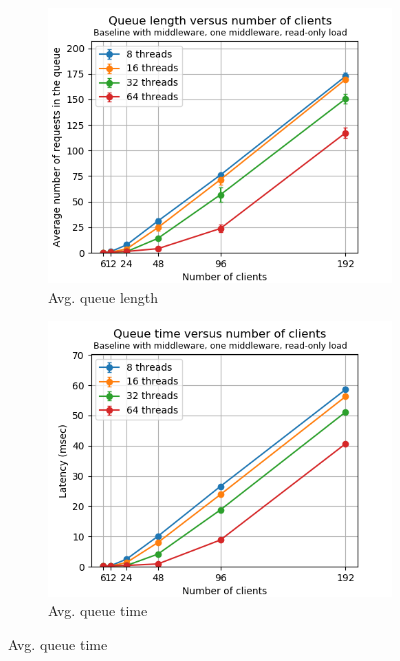 \documentclass[11pt,a4paper]{article}
\begin{document}
\begin{figure}[h]
\centering
\begin{subfigure}{.33\textwidth}
  \centering
  \includegraphics[width=1.0\linewidth,trim={0px 0px 0px 0px},clip]{img/plot/mwb1-ro-qlen-mini.png}
  \caption{Avg. queue length}
  \label{fig:mwb1-ro-qlen-mini}
\end{subfigure}%
\begin{subfigure}{.33\textwidth}
  \centering
  \includegraphics[width=1.0\linewidth,trim={0px 0px 0px 0px},clip]{img/plot/mwb1-ro-qtime-mini.png}
  \caption{Avg. queue time}
  \label{fig:mwb1-ro-qtime-mini}

\end{subfigure}
\end{figure}
\end{document}
